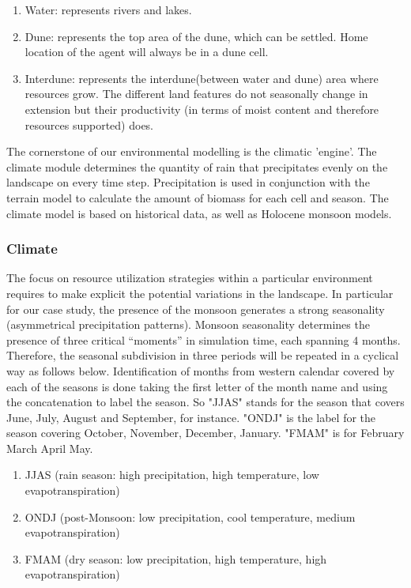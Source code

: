 \documentclass[11pt,oneside,a4paper,openright]{report}
\begin{document}
\begin{enumerate}
\item Water: represents rivers and lakes.
\item Dune: represents the top area of the dune, which can be settled. Home location of the
agent will always be in a dune cell.
\item Interdune: represents the interdune(between water and dune) area where resources grow. The different land
features do not seasonally change in extension but their productivity (in terms of moist content
and therefore resources supported) does.
\end{enumerate}

The cornerstone of our environmental modelling is the climatic 'engine'. The climate module
determines the quantity of rain that precipitates evenly on the landscape on every time step.
Precipitation is used in conjunction with the terrain model to calculate the amount of biomass for each
cell and season. The climate model is based on historical data, as well as Holocene monsoon models.


\subsubsection{Climate}

The focus on resource utilization strategies within a particular environment requires to make explicit
the potential variations in the landscape. In particular for our case study, the presence of the monsoon
generates a strong seasonality (asymmetrical precipitation patterns).
Monsoon seasonality determines the presence of three critical “moments” in simulation time, each
spanning 4 months. Therefore, the seasonal subdivision in three periods will be repeated in a cyclical
way as follows below. Identification of months from western calendar covered by each of the seasons is done 
taking the first letter of the month name and using the concatenation to label the season. So "JJAS" stands 
for the season that covers June, July, August and September, for instance. "ONDJ" is the label for the 
season covering October, November, December, January. "FMAM" is for February March April May.    


\begin{enumerate}
\item JJAS (rain season: high precipitation, high temperature, low evapotranspiration)
\item ONDJ (post-Monsoon: low precipitation, cool temperature, medium evapotranspiration)
\item FMAM (dry season: low precipitation, high temperature, high evapotranspiration)
\end{enumerate}
\end{document}
